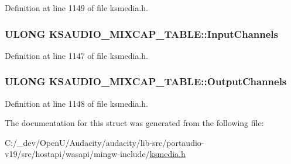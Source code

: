 Definition at line 1149 of file ksmedia.\+h.

\subsubsection[{\texorpdfstring{Input\+Channels}{InputChannels}}]{\setlength{\rightskip}{0pt plus 5cm}U\+L\+O\+NG K\+S\+A\+U\+D\+I\+O\+\_\+\+M\+I\+X\+C\+A\+P\+\_\+\+T\+A\+B\+L\+E\+::\+Input\+Channels}\hypertarget{struct_k_s_a_u_d_i_o___m_i_x_c_a_p___t_a_b_l_e_aeebf10ed548852b997e1b0b1f25dc583}{}\label{struct_k_s_a_u_d_i_o___m_i_x_c_a_p___t_a_b_l_e_aeebf10ed548852b997e1b0b1f25dc583}


Definition at line 1147 of file ksmedia.\+h.

\subsubsection[{\texorpdfstring{Output\+Channels}{OutputChannels}}]{\setlength{\rightskip}{0pt plus 5cm}U\+L\+O\+NG K\+S\+A\+U\+D\+I\+O\+\_\+\+M\+I\+X\+C\+A\+P\+\_\+\+T\+A\+B\+L\+E\+::\+Output\+Channels}\hypertarget{struct_k_s_a_u_d_i_o___m_i_x_c_a_p___t_a_b_l_e_af61fe97ed4dc6b0b96695f7f59bba9c5}{}\label{struct_k_s_a_u_d_i_o___m_i_x_c_a_p___t_a_b_l_e_af61fe97ed4dc6b0b96695f7f59bba9c5}


Definition at line 1148 of file ksmedia.\+h.



The documentation for this struct was generated from the following file\+:\begin{DoxyCompactItemize}
\item 
C\+:/\+\_\+dev/\+Open\+U/\+Audacity/audacity/lib-\/src/portaudio-\/v19/src/hostapi/wasapi/mingw-\/include/\hyperlink{ksmedia_8h}{ksmedia.\+h}\end{DoxyCompactItemize}
